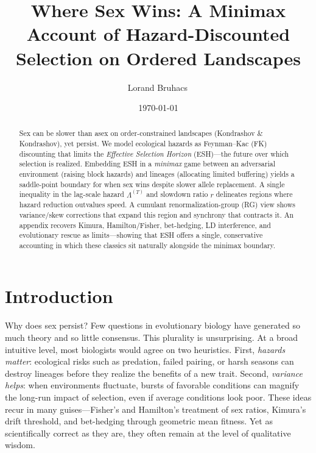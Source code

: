 \documentclass[11pt]{article}
\title{Where Sex Wins: A Minimax Account of Hazard-Discounted Selection on Ordered Landscapes}
\author{Lorand Bruhacs\,\orcidlink{0009-0004-6751-0715}}
\date{\normalsize \today}
\theoremstyle{upright}
\newcommand{\horizon}{\Lambda}
\begin{document}
\maketitle

\begin{abstract}
Sex can be slower than asex on order-constrained landscapes (Kondrashov \& Kondrashov), yet persist. We model ecological hazards as Feynman--Kac (FK) discounting that limits the \emph{Effective Selection Horizon} (ESH)---the future over which selection is realized. Embedding ESH in a \emph{minimax} game between an adversarial environment (raising block hazards) and lineages (allocating limited buffering) yields a saddle-point boundary for when sex wins despite slower allele replacement. A single inequality in the lag-scale hazard $\horizon^{(T)}$ and slowdown ratio $r$ delineates regions where hazard reduction outvalues speed. A cumulant renormalization-group (RG) view shows variance/skew corrections that expand this region and synchrony that contracts it. An appendix recovers Kimura, Hamilton/Fisher, bet-hedging, LD interference, and evolutionary rescue as limits—showing that ESH offers a single, conservative accounting in which these classics sit naturally alongside the minimax boundary.
\end{abstract}

\tableofcontents

\section{Introduction}
\label{sec:intro}

Why does sex persist? Few questions in evolutionary biology have generated so
much theory and so little consensus. This plurality is unsurprising. At a broad intuitive level, most biologists
would agree on two heuristics. First, \emph{hazards matter}: ecological risks
such as predation, failed pairing, or harsh seasons can destroy lineages before
they realize the benefits of a new trait. Second, \emph{variance helps}: when
environments fluctuate, bursts of favorable conditions can magnify the long-run
impact of selection, even if average conditions look poor. These ideas recur in
many guises---Fisher’s and Hamilton’s treatment of sex ratios, Kimura’s drift
threshold, and bet-hedging through geometric mean fitness. Yet as scientifically
correct as they are, they often remain at the level of qualitative wisdom.
\end{document}

